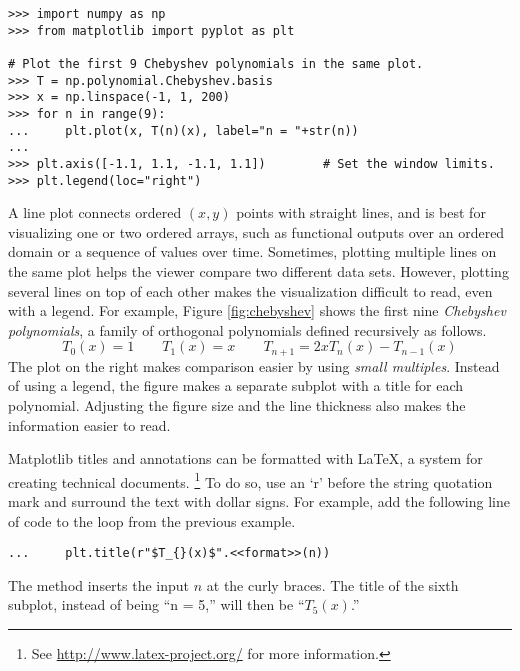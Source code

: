 \begin{lstlisting}
>>> import numpy as np
>>> from matplotlib import pyplot as plt

# Plot the first 9 Chebyshev polynomials in the same plot.
>>> T = np.polynomial.Chebyshev.basis
>>> x = np.linspace(-1, 1, 200)
>>> for n in range(9):
...     plt.plot(x, T(n)(x), label="n = "+str(n))
...
>>> plt.axis([-1.1, 1.1, -1.1, 1.1])        # Set the window limits.
>>> plt.legend(loc="right")
\end{lstlisting}

A line plot connects ordered $(x,y)$ points with straight lines, and is best for visualizing one or two ordered arrays, such as functional outputs over an ordered domain or a sequence of values over time.
Sometimes, plotting multiple lines on the same plot helps the viewer compare two different data sets.
However, plotting several lines on top of each other makes the visualization difficult to read, even with a legend.
For example, Figure \ref{fig:chebyshev} shows the first nine \emph{Chebyshev polynomials}, a family of orthogonal polynomials defined recursively as follows.
\[
T_0(x) = 1 \qquad T_1(x) = x \qquad T_{n+1} = 2xT_n(x) - T_{n-1}(x)
\]
The plot on the right makes comparison easier by using \emph{small multiples}. %
Instead of using a legend, the figure makes a separate subplot with a title for each polynomial.
Adjusting the figure size and the line thickness also makes the information easier to read.


\begin{info} %
Matplotlib titles and annotations can be formatted with \LaTeX, a system for creating technical documents.%
\footnote{See \url{http://www.latex-project.org/} for more information.}
To do so, use an `r' before the string quotation mark and surround the text with dollar signs.
For example, add the following line of code to the loop from the previous example.

\begin{lstlisting}
...     plt.title(r"$T_{}(x)$".<<format>>(n))
\end{lstlisting}

The  method inserts the input $n$ at the curly braces.
The title of the sixth subplot, instead of being ``n = 5,'' will then be ``$T_5(x)$.''
\end{info}

